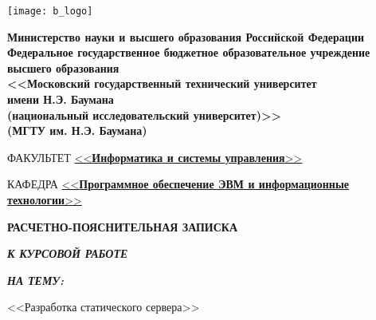 \begin{titlepage}
	\noindent\begin{minipage}{0.05\textwidth}
		\texttt{[image: b\_logo]}
	\end{minipage}
	\hfill
	\begin{minipage}{0.85\textwidth}\raggedleft
		\begin{center}
			\fontsize{12pt}{0.3\baselineskip}\selectfont \textbf{Министерство науки и высшего образования Российской Федерации \\ Федеральное государственное бюджетное образовательное учреждение \\ высшего образования \\ <<Московский государственный технический университет \\ имени Н.Э. Баумана \\ (национальный исследовательский университет)>> \\ (МГТУ им. Н.Э. Баумана)}
		\end{center}
	\end{minipage}
	
	\begin{center}
		\fontsize{12pt}{0.1\baselineskip}\selectfont
		\noindent\makebox[\linewidth]{\rule{\textwidth}{4pt}} \makebox[\linewidth]{\rule{\textwidth}{1pt}}
	\end{center}
	
	\begin{flushleft}
		\fontsize{12pt}{0.8\baselineskip}\selectfont 
		
		ФАКУЛЬТЕТ \uline{<<\textbf{Информатика и системы управления}>> \hfill}
		
		КАФЕДРА \uline{\mbox{\hspace{4mm}} <<\textbf{Программное обеспечение ЭВМ и информационные технологии}>> \hfill}
	\end{flushleft}
	
	\vfill
	
	\begin{center}
		\fontsize{20pt}{\baselineskip}\selectfont
		
		\textbf{РАСЧЕТНО-ПОЯСНИТЕЛЬНАЯ ЗАПИСКА}
		
		\textbf{\textit{К КУРСОВОЙ РАБОТЕ}}
		
		\textbf{\textit{НА ТЕМУ:}}
	\end{center}
	
	\begin{center}
		\fontsize{18pt}{0.6cm}\selectfont 
		
		<<Разработка статического сервера>>
		

\end{center}
\end{titlepage}
